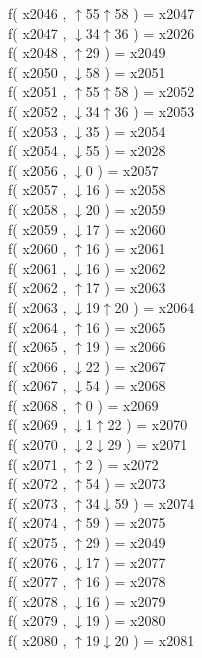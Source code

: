 f( x2046 , $\uparrow$55$\uparrow$58 ) = x2047 \\
f( x2047 , $\downarrow$34$\uparrow$36 ) = x2026 \\
f( x2048 , $\uparrow$29 ) = x2049 \\
f( x2050 , $\downarrow$58 ) = x2051 \\
f( x2051 , $\uparrow$55$\uparrow$58 ) = x2052 \\
f( x2052 , $\downarrow$34$\uparrow$36 ) = x2053 \\
f( x2053 , $\downarrow$35 ) = x2054 \\
f( x2054 , $\downarrow$55 ) = x2028 \\
f( x2056 , $\downarrow$0 ) = x2057 \\
f( x2057 , $\downarrow$16 ) = x2058 \\
f( x2058 , $\downarrow$20 ) = x2059 \\
f( x2059 , $\downarrow$17 ) = x2060 \\
f( x2060 , $\uparrow$16 ) = x2061 \\
f( x2061 , $\downarrow$16 ) = x2062 \\
f( x2062 , $\uparrow$17 ) = x2063 \\
f( x2063 , $\downarrow$19$\uparrow$20 ) = x2064 \\
f( x2064 , $\uparrow$16 ) = x2065 \\
f( x2065 , $\uparrow$19 ) = x2066 \\
f( x2066 , $\downarrow$22 ) = x2067 \\
f( x2067 , $\downarrow$54 ) = x2068 \\
f( x2068 , $\uparrow$0 ) = x2069 \\
f( x2069 , $\downarrow$1$\uparrow$22 ) = x2070 \\
f( x2070 , $\downarrow$2$\downarrow$29 ) = x2071 \\
f( x2071 , $\uparrow$2 ) = x2072 \\
f( x2072 , $\uparrow$54 ) = x2073 \\
f( x2073 , $\uparrow$34$\downarrow$59 ) = x2074 \\
f( x2074 , $\uparrow$59 ) = x2075 \\
f( x2075 , $\uparrow$29 ) = x2049 \\
f( x2076 , $\downarrow$17 ) = x2077 \\
f( x2077 , $\uparrow$16 ) = x2078 \\
f( x2078 , $\downarrow$16 ) = x2079 \\
f( x2079 , $\downarrow$19 ) = x2080 \\
f( x2080 , $\uparrow$19$\downarrow$20 ) = x2081 \\
